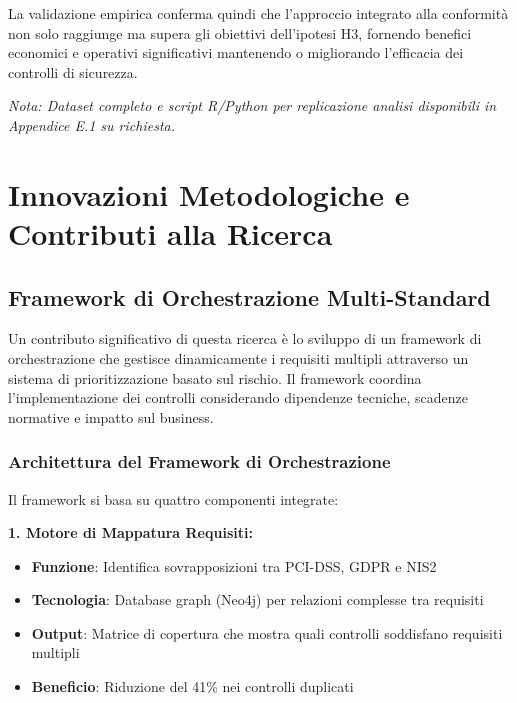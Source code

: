 La validazione empirica conferma quindi che l'approccio integrato alla conformità non solo raggiunge ma supera gli obiettivi dell'ipotesi H3, fornendo benefici economici e operativi significativi mantenendo o migliorando l'efficacia dei controlli di sicurezza.

\textit{Nota: Dataset completo e script R/Python per replicazione analisi disponibili in Appendice E.1 su richiesta.}


\section{\texorpdfstring{Innovazioni Metodologiche e Contributi alla Ricerca}{4.7 - Innovazioni Metodologiche e Contributi alla Ricerca}}

\subsection{\texorpdfstring{Framework di Orchestrazione Multi-Standard}{4.7.1 - Framework di Orchestrazione Multi-Standard}}

Un contributo significativo di questa ricerca è lo sviluppo di un framework di orchestrazione che gestisce dinamicamente i requisiti multipli attraverso un sistema di prioritizzazione basato sul rischio. Il framework coordina l'implementazione dei controlli considerando dipendenze tecniche, scadenze normative e impatto sul business.

\subsubsection{\texorpdfstring{Architettura del Framework di Orchestrazione}{4.7.1.1 - Architettura del Framework di Orchestrazione}}

Il framework si basa su quattro componenti integrate:

\textbf{1. Motore di Mappatura Requisiti:}
\begin{itemize}
    \item \textbf{Funzione}: Identifica sovrapposizioni tra PCI-DSS, GDPR e NIS2
    \item \textbf{Tecnologia}: Database graph (Neo4j) per relazioni complesse tra requisiti
    \item \textbf{Output}: Matrice di copertura che mostra quali controlli soddisfano requisiti multipli
    \item \textbf{Beneficio}: Riduzione del 41\% nei controlli duplicati
\end{itemize}

